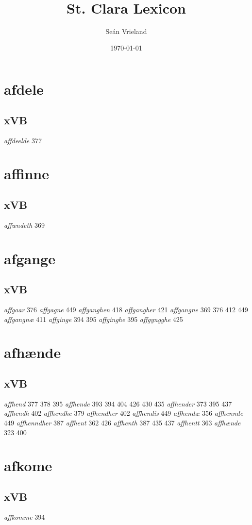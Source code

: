 \documentclass[a4paper,twocolumn]{article}
\author{Seán Vrieland}
\date{\today}
\title{St. Clara Lexicon}
\renewcommand\maketitle{}
\begin{document}
\maketitle
\section{afdele}
\label{sec:orgf17d57c}
\subsection{xVB}
\label{sec:org39faf65}
\emph{affdeelde} 377 
\section{affinne}
\label{sec:org8a85152}
\subsection{xVB}
\label{sec:org196d2b7}
\emph{affwndeth} 369 
\section{afgange}
\label{sec:org186ce91}
\subsection{xVB}
\label{sec:orgd1e942e}
\emph{affgaar} 376 \emph{affgagne} 449 \emph{affganghen} 418 \emph{affgangher} 421 \emph{affgangne} 369 376 412 449 \emph{affgangnæ} 411 \emph{affginge} 394 395 \emph{affginghe} 395 \emph{affgyngghe} 425 
\section{afhænde}
\label{sec:orgfc8d0cc}
\subsection{xVB}
\label{sec:orgce6f72d}
\emph{affhend} 377 378 395 \emph{affhende} 393 394 404 426 430 435 \emph{affhender} 373 395 437 \emph{affhendh} 402 \emph{affhendhe} 379 \emph{affhendher} 402 \emph{affhendis} 449 \emph{affhendæ} 356 \emph{affhennde} 449 \emph{affhenndher} 387 \emph{affhent} 362 426 \emph{affhenth} 387 435 437 \emph{affhentt} 363 \emph{affhænde} 323 400 
\section{afkome}
\label{sec:org0fa609c}
\subsection{xVB}
\label{sec:orga1d9379}
\emph{affkomme} 394 
\end{document}
